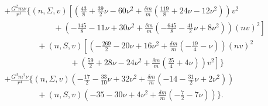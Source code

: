 {\begin{align}
 &+\frac{G^{2}m\nu}{r^{3}}\bigg\{ 
 (n,\Sigma,v)\left[\left(\frac{43}{8} + \frac{39}{2} \nu -60 \nu^2+\frac{\delta m}{m}\left(\frac{119}{8} + 24 \nu -12 \nu^2\right)\right) v^{2}\right.\nonumber\\
    &\left.\qquad\qquad\qquad+\left(-\frac{145}{8} -11 \nu + 30 \nu^2+\frac{\delta m}{m}\left(-\frac{645}{8} -\frac{41}{2} \nu + 8 \nu^2\right)\right) (nv)^2\right]\nonumber \\ 
 &\qquad \qquad + (n,S,v)\left[\left(-\frac{269}{2} -20 \nu + 16 \nu^2+\frac{\delta m}{m}\left(-\frac{19}{4} - \nu\right)\right) (nv)^2\right.\nonumber\\
    &\left.\qquad\qquad\qquad\qquad+\left(\frac{59}{2} + 28 \nu -24 \nu^2+\frac{\delta m}{m}\left(\frac{25}{4} + 4 \nu\right)\right) v^{2}\right]\bigg\}\nonumber \\
 &+\frac{G^{3}m^{2}\nu}{r^{4}}\bigg\{ 
 (n,\Sigma,v)\left(-\frac{17}{2} -\frac{33}{10} \nu + 32 \nu^2+\frac{\delta m}{m}\left(-14 -\frac{31}{2} \nu + 2 \nu^2\right)\right)\nonumber \\ 
 &\qquad\qquad + (n,S,v)\left(-35 -30 \nu + 4 \nu^2+\frac{\delta m}{m}\left(-\frac{7}{2} -7 \nu\right)\right)\bigg\}.
\end{align}}